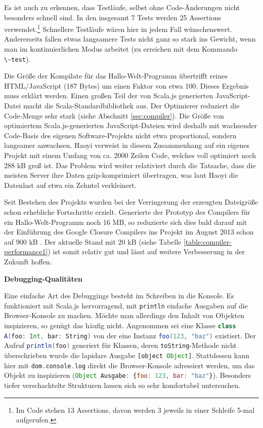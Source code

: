 \documentclass[a4paper, 12pt, hidelinks, listof=totoc, listoftables=totoc, bibliography=totoc]{scrreprt}
\newcommand{\code}[1]{\lstinline[language=Scala, style=inline]|#1|}
\newcommand{\scala}[1]{\lstinline[language=Scala, style=inline]|#1|}
\newcommand{\js}[1]{\lstinline[language=JavaScript, style=inline]|#1|}
\newcommand{\MyMiniSec}[1]{\rmfamily\fontsize{12}{15}\selectfont
	\vspace{7pt}\textbf{#1} %
}
\begin{document}
Es ist auch zu erkennen, dass Testläufe, selbst ohne Code-Änderungen nicht besonders schnell sind. In den insgesamt 7 Tests werden 25 Assertions verwendet.\footnote{Im Code stehen 13 Assertions, davon werden 3 jeweils in einer Schleife 5-mal aufgerufen.} Schnellere Testläufe wären hier in jedem Fall wünschenswert. Andererseits fallen etwas langsamere Tests nicht ganz so stark ins Gewicht, wenn man im kontinuierlichen Modus arbeitet (zu erreichen mit dem Kommando \code{\~test}).

Die Größe der Kompilate für das Hallo-Welt-Programm übertrifft reines \ac{HTML}/JavaScript (187 Bytes) um einen Faktor von etwa 100. Dieses Ergebnis muss erklärt werden. Einen großen Teil der von Scala.js generierten JavaScript-Datei macht die Scala-Standardbibliothek aus. Der Optimierer reduziert die Code-Menge sehr stark (siehe Abschnitt \ref{sec:compiler}). Die Größe von optimiertem Scala.js-generierten JavaScript-Dateien wird deshalb mit wachsender Code-Basis des eigenen Software-Projekts nicht etwa proportional, sondern langsamer anwachsen. Haoyi verweist in diesem Zusammenhang auf ein eigenes Projekt mit einem Umfang von ca. 2000 Zeilen Code, welches voll optimiert noch 288 kB groß ist. Das Problem wird weiter relativiert durch die Tatsache, dass die meisten Server ihre Daten gzip-komprimiert übertragen, was laut Haoyi die Datenlast auf etwa ein Zehntel verkleinert. \cite[\#BlobSize]{haoyi.HOS}

Seit Bestehen des Projekts wurden bei der Verringerung der erzeugten Dateigröße schon erhebliche Fortschritte erzielt. Generierte der Prototyp des Compilers für ein Hallo-Welt-Programm noch 16 MB, so reduzierte sich dies bald darauf mit der Einführung des Google Closure Compilers ins Projekt im August 2013 schon auf 900 kB \cite[Folie~5~f., Min.~6]{doeraene2014.WHB}. Der aktuelle Stand mit 20 kB (siehe Tabelle \ref{table:compiler-performance1}) ist somit relativ gut und lässt auf weitere Verbesserung in der Zukunft hoffen.


\MyMiniSec{Debugging-Qualitäten}

Eine einfache Art des Debuggings besteht im Schreiben in die Konsole. Es funktioniert mit Scala.js hervorragend, mit \scala{println} einfache Ausgaben auf die Browser-Konsole zu machen. Möchte man allerdings den Inhalt von Objekten inspizieren, so genügt das häufig nicht. Angenommen sei eine Klasse \scala{class A(foo: Int, bar: String)} von der eine Instanz \scala{foo(123, "baz")} existiert. Der Aufruf \scala{println(foo)} generiert für Klassen, deren \scala{toString}-Methode nicht überschrieben wurde die lapidare Ausgabe \js{[object Object]}. Stattdessen kann hier mit \scala{dom.console.log} direkt die Browser-Konsole adressiert werden, um das Objekt zu inspizieren (\js{Object Ausgabe: {foo: 123, bar: "baz"}}). Besonders tiefer verschachtelte Strukturen lassen sich so sehr komfortabel untersuchen.
\end{document}
